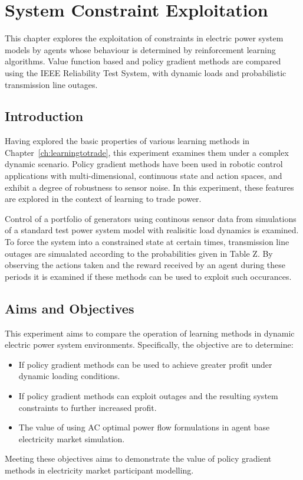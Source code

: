 \chapter{System Constraint Exploitation}
\label{ch:exploitation}
This chapter explores the exploitation of constraints in electric power
system models by agents whose behaviour is determined by reinforcement learning
algorithms.  Value function based and policy gradient methods are compared
using the IEEE Reliability Test System, with dynamic loads and probabilistic
transmission line outages.

\section{Introduction}
Having explored the basic properties of various learning methods in
Chapter~\ref{ch:learningtotrade}, this experiment examines them under a complex dynamic scenario.  Policy gradient methods have been used in robotic control
applications with multi-dimensional, continuous state and action spaces, and
exhibit a degree of robustness to sensor noise.  In this experiment,
these features are explored in the context of learning to trade power.

Control of a portfolio of generators using continous sensor data from
simulations of a standard test power system model with realisitic load dynamics
is examined.  To force the system into a constrained state at certain times, transmission line outages are simualated according to the probabilities given in Table Z.  By
observing the actions taken and the reward received by an agent during these
periods it is examined if these methods can be used to exploit such
occurances.

\section{Aims and Objectives}
This experiment aims to compare the operation of learning methods in dynamic
electric power system environments.  Specifically, the objective are to
determine:
\begin{itemize}
  \item If policy gradient methods can be used to achieve greater profit under
  dynamic loading conditions.
  \item If policy gradient methods can exploit outages and the resulting system
  constraints to further increased profit.
  \item The value of using AC optimal power flow formulations in agent base
  electricity market simulation.
\end{itemize}
Meeting these objectives aims to demonstrate the value of policy gradient
methods in electricity market participant modelling.

